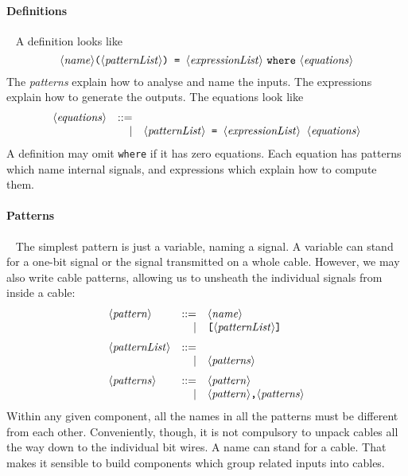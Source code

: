 \documentclass{article}
\begin{document}
\paragraph{Definitions}~ A definition looks like
\[
  \langle\mathit{name}\rangle\texttt{(}\langle\mathit{patternList}\rangle\texttt{)}\texttt{~=~}\langle\mathit{expressionList}\rangle
    ~\texttt{where}~\langle\mathit{equations}\rangle
  \]
The \emph{patterns} explain how to analyse and name the inputs.
The expressions explain how to generate the outputs. The equations
look like
\[\begin{array}{lrl}
    \langle\mathit{equations}\rangle & ::= &  \\
              &   | & \langle\mathit{patternList}\rangle\texttt{~=~}\langle\mathit{expressionList}\rangle\;\;  \langle\mathit{equations}\rangle
\end{array}
\]
A definition may omit \texttt{where} if it has zero equations. Each
equation has patterns which name internal signals, and expressions
which explain how to compute them.

\paragraph{Patterns}~ The simplest pattern is just a variable, naming
a signal. A variable can stand for a one-bit signal or the signal
transmitted on a whole cable. However, we may also write cable
patterns, allowing us to unsheath the individual signals from inside
a cable:
\[\begin{array}{lrl}
    \NT{pattern} & ::= & \NT{name} \\
              &   | & \cab{\NT{patternList}} \medskip\\
    \NT{patternList} & ::= & \\
              &   | & \NT{patterns}  \medskip\\
    \NT{patterns} & ::= & \NT{pattern} \\
               &   | & \NT{pattern}\texttt{,}\NT{patterns}
  \end{array} \]
Within any given component, all the names in all the patterns must be
different from each other. Conveniently, though, it is not compulsory
to unpack cables all the way down to the individual bit wires. A name
can stand for a cable. That makes it sensible to build components
which group related inputs into cables.
\end{document}
